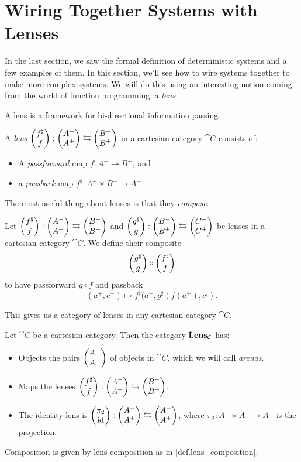 \documentclass[DynamicalBook]{subfiles}
\begin{document}
\section{Wiring Together Systems with Lenses}

In the last section, we saw the formal definition of deterministic systems and a
few examples of them. In this section, we'll see how to wire systems together to
make more complex systems. We will do this using an interesting notion coming
from the world of function programming: a \emph{lens}.

A lens is a framework for bi-directional information passing.

\begin{definition}\label{def.lens}
  A \emph{lens} $\begin{pmatrix}{f^{\sharp}} \\ {f} \end{pmatrix} : \begin{pmatrix}{A^-} \\ {A^+} \end{pmatrix} \leftrightarrows
  \begin{pmatrix}{B^-} \\ {B^+} \end{pmatrix}$ in a cartesian category $\cat{C}$ consists of:
  \begin{itemize}
  \item A \emph{passforward} map $f : A^+ \to B^+$, and
    \item a \emph{passback} map $f^{\sharp} : A^+ \times B^- \to A^-$
  \end{itemize}
\end{definition}

The most useful thing about lenses is that they \emph{compose}.
\begin{definition}\label{def.lens_composition}
  Let $\begin{pmatrix}{f^{\sharp}} \\ {f} \end{pmatrix} : \begin{pmatrix}{A^-} \\ {A^+} \end{pmatrix} \leftrightarrows \begin{pmatrix}{B^-} \\ {B^+} \end{pmatrix}$ and
  $\begin{pmatrix}{g^{\sharp}} \\ {g} \end{pmatrix} : \begin{pmatrix}{B^-} \\ {B^+} \end{pmatrix} \leftrightarrows \begin{pmatrix}{C^-} \\ {C^+} \end{pmatrix}$ be lenses in
  a cartesian category $\cat{C}$. We define their composite
  $$\begin{pmatrix}{g^{\sharp}} \\ {g} \end{pmatrix} \circ \begin{pmatrix}{f^{\sharp}} \\ {f} \end{pmatrix}$$
  to have passforward $g \circ f$ and passback
  $$(a^+, c^-) \mapsto f^{\sharp}(a^+, g^{\sharp}(f(a^+), c^_)).$$

\end{definition}

This gives us a category of lenses in any cartesian category $\cat{C}$.
\begin{definition}\label{def.lens_category}
Let $\cat{C}$ be a cartesian category. Then the category $\textbf{Lens}_{\mathcal{C}}$
has:
\begin{itemize}
\item Objects the pairs $\begin{pmatrix}{A^-} \\ {A^+} \end{pmatrix}$ of objects in $\cat{C}$, which we will
  call \emph{arenas}.
\item Maps the lenses $\begin{pmatrix}{f^{\sharp}} \\ {f} \end{pmatrix} : \begin{pmatrix}{A^-} \\ {A^+} \end{pmatrix} \leftrightarrows \begin{pmatrix}{B^-} \\ {B^+} \end{pmatrix}$.
\item The identity lens is $\begin{pmatrix}{\pi_2} \\ {\mathrm{id}} \end{pmatrix} : \begin{pmatrix}{A^-} \\ {A^+} \end{pmatrix} \leftrightarrows
  \begin{pmatrix}{A^-} \\ {A^+} \end{pmatrix}$, where $\pi_2 : A^+ \times A^- \to A^-$ is the projection.
\end{itemize}
\item Composition is given by lens composition as in \cref{def.lens_composition}.
\end{definition}
\end{document}
